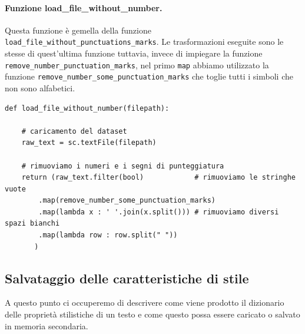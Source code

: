 \documentclass[titlepage]{article}
\begin{document}
\paragraph{Funzione load\_file\_without\_number.}
Questa funzione è gemella della funzione \texttt{load\_file\_without\_punctuations\_marks}. Le trasformazioni eseguite sono le stesse di quest'ultima funzione tuttavia, invece di impiegare la funzione \texttt{remove\_number\_punctuation\_marks}, nel primo \texttt{map} abbiamo utilizzato la funzione \texttt{remove\_number\_some\_punctuation\_marks} che toglie tutti i simboli che non sono alfabetici.
\begin{verbatim}
def load_file_without_number(filepath):
    
    # caricamento del dataset
    raw_text = sc.textFile(filepath)

    # rimuoviamo i numeri e i segni di punteggiatura
    return (raw_text.filter(bool)            # rimuoviamo le stringhe vuote
        .map(remove_number_some_punctuation_marks)
        .map(lambda x : ' '.join(x.split())) # rimuoviamo diversi spazi bianchi
        .map(lambda row : row.split(" "))
       )
\end{verbatim}

\subsection{Salvataggio delle caratteristiche di stile}
A questo punto ci occuperemo di descrivere come viene prodotto il dizionario delle proprietà stilistiche di un testo e come questo possa essere caricato o salvato in memoria secondaria.
\end{document}
